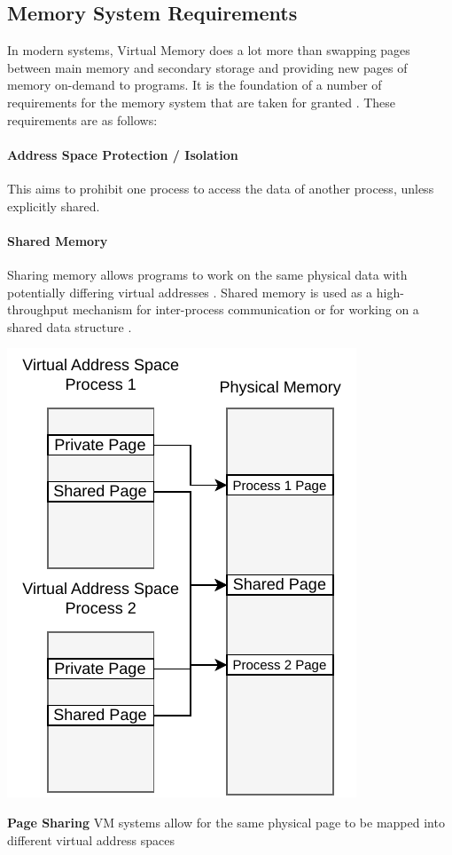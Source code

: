 \subsection{Memory System Requirements}
In modern systems, Virtual Memory does a lot more than swapping pages between main memory and secondary
storage and providing new pages of memory on-demand to programs.
It is the foundation of a number of requirements for the memory system that are taken for granted
\cite{jacobSoftwaremanagedAddressTranslation1997}.
These requirements are as follows:


\paragraph{Address Space Protection / Isolation} This aims to prohibit one process to access the data
of another process, unless explicitly shared.
\cite{jacobVirtualMemoryContemporary1998}


\paragraph{Shared Memory} Sharing memory allows programs to work on the same physical data with potentially
differing virtual addresses \cite{jacobVirtualMemoryContemporary1998}.
Shared memory is used as a high-throughput mechanism for inter-process communication or for working on
a shared data structure \cite{tanenbaumOS}.

\begin{marginfigure}
    \includegraphics*[width=1\marginparwidth]{figures/fund_share.pdf}
    \caption{\textbf{Page Sharing} VM systems allow for the same physical page to be mapped into different virtual address spaces}
\end{marginfigure}

